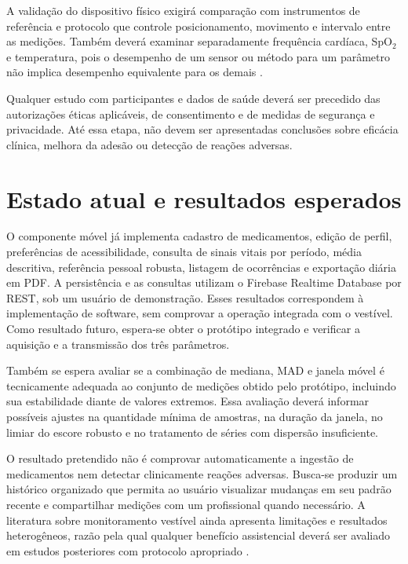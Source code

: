 \documentclass[12pt]{article}
\begin{document}
A validação do dispositivo físico exigirá comparação com instrumentos de referência e protocolo que controle posicionamento, movimento e intervalo entre as medições. Também deverá examinar separadamente frequência cardíaca, SpO$_2$ e temperatura, pois o desempenho de um sensor ou método para um parâmetro não implica desempenho equivalente para os demais \cite{haveman2021continuous}.

Qualquer estudo com participantes e dados de saúde deverá ser precedido das autorizações éticas aplicáveis, de consentimento e de medidas de segurança e privacidade. Até essa etapa, não devem ser apresentadas conclusões sobre eficácia clínica, melhora da adesão ou detecção de reações adversas.

\section{Estado atual e resultados esperados}

O componente móvel já implementa cadastro de medicamentos, edição de perfil, preferências de acessibilidade, consulta de sinais vitais por período, média descritiva, referência pessoal robusta, listagem de ocorrências e exportação diária em PDF. A persistência e as consultas utilizam o Firebase Realtime Database por REST, sob um usuário de demonstração. Esses resultados correspondem à implementação de software, sem comprovar a operação integrada com o vestível. Como resultado futuro, espera-se obter o protótipo integrado e verificar a aquisição e a transmissão dos três parâmetros.

Também se espera avaliar se a combinação de mediana, MAD e janela móvel é tecnicamente adequada ao conjunto de medições obtido pelo protótipo, incluindo sua estabilidade diante de valores extremos. Essa avaliação deverá informar possíveis ajustes na quantidade mínima de amostras, na duração da janela, no limiar do escore robusto e no tratamento de séries com dispersão insuficiente.

O resultado pretendido não é comprovar automaticamente a ingestão de medicamentos nem detectar clinicamente reações adversas. Busca-se produzir um histórico organizado que permita ao usuário visualizar mudanças em seu padrão recente e compartilhar medições com um profissional quando necessário. A literatura sobre monitoramento vestível ainda apresenta limitações e resultados heterogêneos, razão pela qual qualquer benefício assistencial deverá ser avaliado em estudos posteriores com protocolo apropriado \cite{leenen2020current}.



\end{document}
